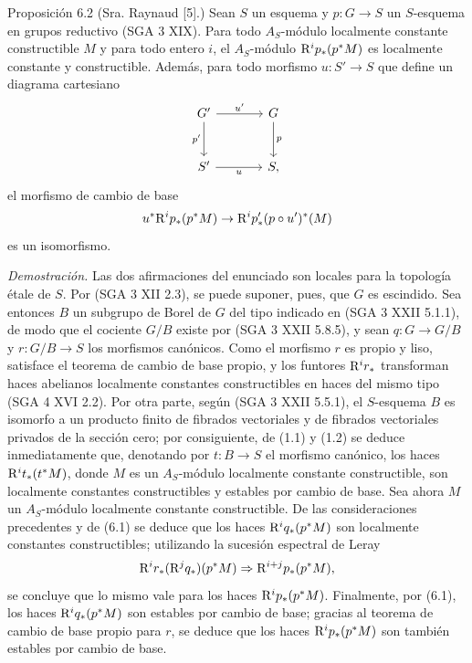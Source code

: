 \begin{statement}{Proposición 6.2}
(Sra. Raynaud [5].) Sean $S$ un esquema y $p:G\to S$ un $S$-esquema en grupos reductivo (SGA 3 XIX). Para todo $A_S$-módulo localmente constante constructible $M$ y para todo entero $i$, el $A_S$-módulo $\mathrm{R}^ip_*(p^*M)$ es localmente constante y constructible. Además, para todo morfismo $u:S'\to S$ que define un diagrama cartesiano
\[
\begin{tikzcd}[column sep=large,row sep=large]
G' \arrow[r,"u'"] \arrow[d,"p'"'] & G \arrow[d,"p"]\\
S' \arrow[r,"u"'] & S,
\end{tikzcd}
\]
el morfismo de cambio de base
\[
u^*\mathrm{R}^ip_*(p^*M)\to \mathrm{R}^ip'_*(p\circ u')^*(M)
\]
es un isomorfismo.
\end{statement}

\emph{Demostración.} Las dos afirmaciones del enunciado son locales para la topología étale de $S$. Por (SGA 3 XII 2.3), se puede suponer, pues, que $G$ es escindido. Sea entonces $B$ un subgrupo de Borel de $G$ del tipo indicado en (SGA 3 XXII 5.1.1), de modo que el cociente $G/B$ existe por (SGA 3 XXII 5.8.5), y sean $q:G\to G/B$ y $r:G/B\to S$ los morfismos canónicos. Como el morfismo $r$ es propio y liso, satisface el teorema de cambio de base propio, y los funtores $\mathrm{R}^ir_*$ transforman haces abelianos localmente constantes constructibles en haces del mismo tipo (SGA 4 XVI 2.2). Por otra parte, según (SGA 3 XXII 5.5.1), el $S$-esquema $B$ es isomorfo a un producto finito de fibrados vectoriales y de fibrados vectoriales privados de la sección cero; por consiguiente, de (1.1) y (1.2) se deduce inmediatamente que, denotando por $t:B\to S$ el morfismo canónico, los haces $\mathrm{R}^it_*(t^*M)$, donde $M$ es un $A_S$-módulo localmente constante constructible, son localmente constantes constructibles y estables por cambio de base. Sea ahora $M$ un $A_S$-módulo localmente constante constructible. De las consideraciones precedentes y de (6.1) se deduce que los haces $\mathrm{R}^iq_*(p^*M)$ son localmente constantes constructibles; utilizando la sucesión espectral de Leray
\[
\mathrm{R}^ir_*(\mathrm{R}^jq_*)(p^*M)\Rightarrow \mathrm{R}^{i+j}p_*(p^*M),
\]
se concluye que lo mismo vale para los haces $\mathrm{R}^ip_*(p^*M)$. Finalmente, por (6.1), los haces $\mathrm{R}^iq_*(p^*M)$ son estables por cambio de base; gracias al teorema de cambio de base propio para $r$, se deduce que los haces $\mathrm{R}^ip_*(p^*M)$ son también estables por cambio de base.
